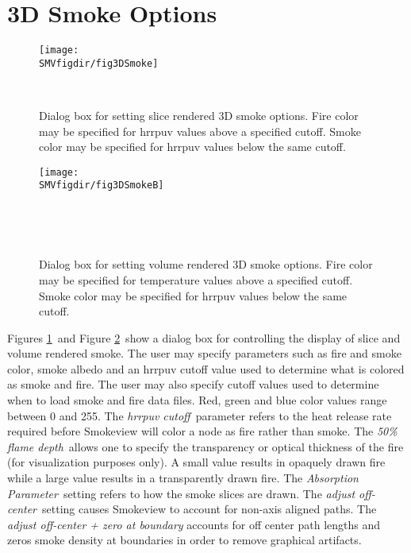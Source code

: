 \documentclass[11pt,twoside]{book}
\begin{document}
\section{3D Smoke Options}
\begin{figure}[bph]
\centerline{\texttt{[image: \\SMVfigdir/fig3DSmoke]}
}\ \caption[Dialog box for setting slice rendered 3D smoke options]
{Dialog box for setting slice rendered 3D smoke options.  Fire color may be specified for hrrpuv values above a specified cutoff.
Smoke color may be specified for hrrpuv values below the same cutoff. }
\label{fig3DSmoke}
\end{figure}
\begin{figure}[bph]
\centerline{\texttt{[image: \\SMVfigdir/fig3DSmokeB]}
}\ \caption[Dialog box for setting volume rendered 3D smoke
options] {Dialog box for setting volume rendered 3D smoke options.
Fire color may be specified for temperature values above a specified cutoff.
Smoke color may be specified for hrrpuv values below the same cutoff.
}\ \label{fig3DSmokeB}
\end{figure}
Figures \ref{fig3DSmoke}\ and Figure \ref{fig3DSmokeB}\ show a dialog box for controlling the display of
slice and volume rendered smoke.
The user may specify parameters such as fire and smoke color, smoke albedo and an hrrpuv cutoff value used
to determine what is colored as smoke and fire.  The user may also specify cutoff values used to determine when to load smoke
and fire data files.
Red, green and blue color values range between 0 and 255.
The {\em hrrpuv cutoff}\ parameter refers to
the heat release rate required before Smokeview will
color a node as fire rather than smoke. The {\em 50\% flame
depth}\ allows one to specify the transparency or optical thickness
of the fire (for visualization purposes only). A small value
results in opaquely drawn fire while a large value results in a
transparently drawn fire. The {\em Absorption Parameter}\ setting
refers to how the smoke slices are drawn.  The {\em adjust
off-center}\ setting causes Smokeview to account for non-axis
aligned paths. The {\em adjust off-center + zero at boundary}
accounts for off center path lengths and zeros smoke density at
boundaries in order to remove graphical artifacts.

\end{document}
